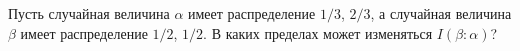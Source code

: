 Пусть случайная величина $\alpha$ имеет распределение $1 / 3$, $2 / 3$, а случайная величина $\beta$
имеет распределение $1 / 2$, $1 / 2$. В каких пределах может изменяться $I(\beta : \alpha)$?